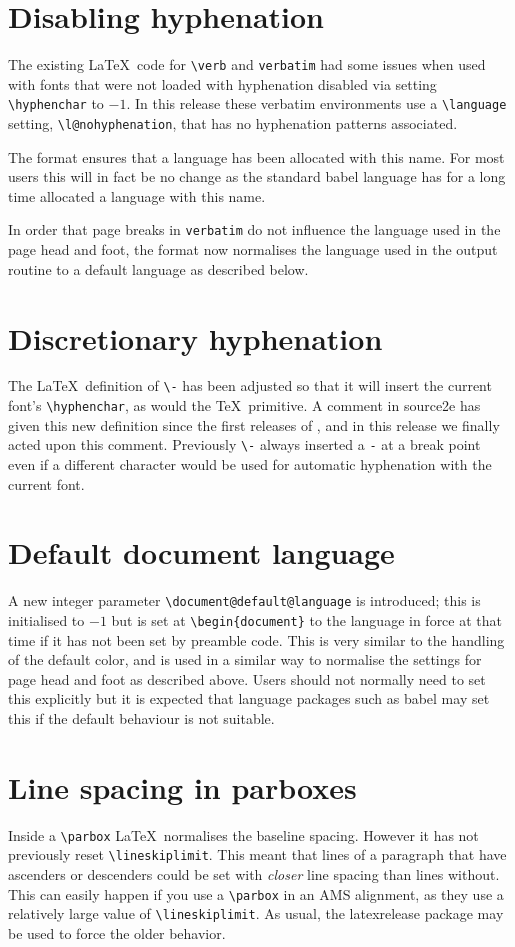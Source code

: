 \documentclass{ltnews}
\begin{document}
\section{Disabling hyphenation}
The existing \LaTeX\ code for \verb|\verb| and \verb|verbatim| had some
issues when used with fonts that were not loaded with hyphenation
disabled via setting \verb|\hyphenchar| to $-1$. In this release these
verbatim environments use a \verb|\language| setting,
\verb|\l@nohyphenation|, that has no hyphenation patterns associated.

The format ensures that  a language has been allocated with this name.
For most users this will in fact be no change as the standard
\textsf{babel} language has for a long time allocated a language with
this name.

In order that page breaks in \texttt{verbatim} do not influence the
language used in the page head and foot, the format now normalises the
language used in the output routine to a default language as described
below.

\section{Discretionary hyphenation}
The \LaTeX\ definition of \verb|\-| has been adjusted so that it will
insert the current font's \verb|\hyphenchar|, as would the
\TeX\ primitive. A comment in \textsf{source2e} has given
this new definition since the first releases of \LaTeXe, and in this
release we finally acted upon this comment. Previously \verb|\-|
always inserted a \texttt{-} at a break point even if a different
character would be used for automatic hyphenation with the current font.

\section{Default document language}

A new integer parameter \verb|\document@default@language| is
introduced; this is initialised to $-1$ but is set at
\verb|\begin{document}| to the language in force at that time if it
  has not been set by preamble code. This is very similar to the
  handling of the default color, and is used in a similar way to
  normalise the settings for page head and foot as described above.
Users should not normally need to set this explicitly but it is expected that
language packages such as \textsf{babel} may set this if the default
behaviour is not suitable.

\section{Line spacing in parboxes}
Inside a \verb|\parbox|
\LaTeX\ normalises the baseline spacing. However it has not
previously reset \verb|\lineskiplimit|. This meant that
lines of a paragraph that have ascenders or descenders could be set
with \emph{closer} line spacing than lines without. This can easily
happen if you use a \verb|\parbox| in an AMS alignment, as they use a
relatively large value of \verb|\lineskiplimit|.
As usual, the \textsf{latexrelease} package may be used to
force the older behavior.
\end{document}
